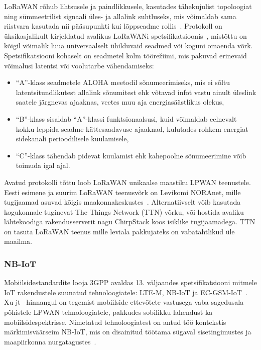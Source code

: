 \documentclass[12pt]{article}
\begin{document}
    LoRaWAN rõhub lihtsusele ja paindlikkusele, kasutades tähekujulist topoloogiat ning sümmeetrilist signaali üles- ja allalink suhtluseks, mis võimaldab sama riistvara kasutada nii pääsupunkti kui lõppseadme rollis~\cite{lorawanIntro}.
    Protokoll on üksikasjalikult kirjeldatud avalikus LoRaWANi spetsifikatsioonis~\cite{lorawanspec}, mistõttu on kõigil võimalik luua universaalselt ühilduvaid seadmed või koguni omaenda võrk.
    Spetsifikatsiooni kohaselt on seadmetel kolm töörežiimi, mis pakuvad erinevaid võimalusi latentsi või voolutarbe vähendamiseks:
    \begin{itemize}
        \item “A”-klass seadmetele ALOHA meetodil sõnumeerimiseks, mis ei sõltu latentsitundlikutest allalink sõnumitest ehk võtavad infot vastu ainult üleslink saatele järgnevas ajaaknas, veetes muu aja energiasäästlikus olekus,
        \item “B”-klass sisaldab “A”-klassi funktsionaalsusi, kuid võimaldab eelnevalt kokku leppida seadme kättesaadavuse ajaaknad, kulutades rohkem energiat sidekanali perioodilisele kuulamisele,
        \item “C”-klass tähendab pidevat kuulamist ehk kahepoolne sõnumeerimine võib toimuda igal ajal.
    \end{itemize}

    Avatud protokolli tõttu loob LoRaWAN unikaalse maastiku LPWAN teenustele.
    Eesti esimene ja suurim LoRaWAN teenusvõrk on Levikomi NORAnet, mille tugijaamad asuvad kõigis maakonnakeskustes~\cite{noranetuudis}.
    Alternatiivselt võib kasutada kogukonnale tuginevat The Things Network (TTN) võrku, või hostida avaliku lähtekoodiga rakendusserverit nagu ChirpStack koos isiklike tugijaamadega.
    TTN on tasuta LoRaWAN teenus mille leviala pakkujateks on vabatahtlikud üle maailma.

    \subsubsection{NB-IoT}

    Mobiilsidestandardite looja 3GPP avaldas 13. väljaandes spetsifikatsiooni mitmele IoT rakendustele suunatud tehnoloogiatele: LTE-M, NB-IoT ja EC-GSM-IoT~\cite{3gppiot}.
    Xu jt~\cite{xuyao} hinnangul on tegemist mobiilside ettevõtete vastusega vaba sagedusala põhistele  LPWAN tehnoloogiatele, pakkudes sobilikku lahendust ka mobiilsidespektrisse.
    Nimetatud tehnoloogiatest on antud töö kontekstis märkimisväärseim NB-IoT, mis on disainitud töötama sügaval sisetingimustes ja maapiirkonna nurgatagustes~\cite{martinez}.
\end{document}
